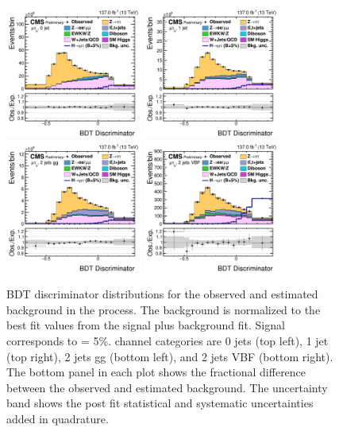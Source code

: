 \begin{figure}[htbp!]
  \centering
  \includegraphics[width=0.4\textwidth]{plots/chapter9/BDT/mutau/0jet.png}
  \includegraphics[width=0.4\textwidth]{plots/chapter9/BDT/mutau/1jet.png} \\
  \includegraphics[width=0.4\textwidth]{plots/chapter9/BDT/mutau/2jet_gg.png}
  \includegraphics[width=0.4\textwidth]{plots/chapter9/BDT/mutau/2jet_vbf.png} \\
  \caption{BDT discriminator distributions for the observed and estimated background in the \Hmuhad process. The background is normalized to the best fit values from the signal plus background fit. Signal corresponds to \BHmt = 5\%. \Hmuhad channel categories are 0 jets (top left), 1 jet (top right), 2 jets gg (bottom left), and 2 jets VBF (bottom right). The bottom panel in each plot shows the fractional difference between the observed and estimated background. The uncertainty band shows the post fit statistical and systematic uncertainties added in quadrature.}
  \label{fig:bdt_muhad}
\end{figure}

